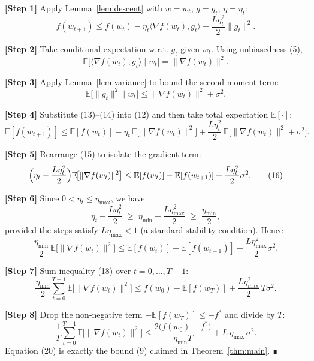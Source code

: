 \documentclass{article}
\begin{document}
\noindent\textbf{[Step 1]} Apply Lemma~\ref{lem:descent} with $w=w_t$, $g=g_t$, $\eta=\eta_t$:
\[
f(w_{t+1})\le f(w_t)-\eta_t\langle\nabla f(w_t),g_t\rangle+\frac{L\eta_t^{2}}{2}\|g_t\|^{2}.
\tag{12}
\]

\noindent\textbf{[Step 2]} Take conditional expectation w.r.t. $g_t$ given $w_t$.
Using unbiasedness (5),
\[
\mathbb{E}\big[\langle\nabla f(w_t),g_t\rangle\mid w_t\big]
    =\|\nabla f(w_t)\|^{2}.
\tag{13}
\]

\noindent\textbf{[Step 3]} Apply Lemma~\ref{lem:variance} to bound the second moment term:
\[
\mathbb{E}\big[\|g_t\|^{2}\mid w_t\big]
    \le \|\nabla f(w_t)\|^{2}+\sigma^{2}.
\tag{14}
\]

\noindent\textbf{[Step 4]} Substitute (13)–(14) into (12) and then take total expectation $\mathbb{E}[\cdot]$:
\[
\mathbb{E}[f(w_{t+1})]
\le \mathbb{E}[f(w_t)]
      -\eta_t\,\mathbb{E}\!\big[\|\nabla f(w_t)\|^{2}\big]
      +\frac{L\eta_t^{2}}{2}\,\mathbb{E}\!\big[\|\nabla f(w_t)\|^{2}+\sigma^{2}\big].
\tag{15}
\]

\noindent\textbf{[Step 5]} Rearrange (15) to isolate the gradient term:
\[
\Bigl(\eta_t-\frac{L\eta_t^{2}}{2}\Bigr)\mathbb{E}\!\big[\|\nabla f(w_t)\|^{2}\big]
\le \mathbb{E}[f(w_t)]-\mathbb{E}[f(w_{t+1})]+\frac{L\eta_t^{2}}{2}\sigma^{2}.
\tag{16}
\]

\noindent\textbf{[Step 6]} Since $0<\eta_t\le\eta_{\max}$, we have
\[
\eta_t-\frac{L\eta_t^{2}}{2}
\;\ge\;
\eta_{\min}-\frac{L\eta_{\max}^{2}}{2}
\;\ge\;
\frac{\eta_{\min}}{2},
\tag{17}
\]
provided the steps satisfy $L\eta_{\max}<1$ (a standard stability condition).  Hence
\[
\frac{\eta_{\min}}{2}\,\mathbb{E}\!\big[\|\nabla f(w_t)\|^{2}\big]
\le
\mathbb{E}[f(w_t)]-\mathbb{E}[f(w_{t+1})]+\frac{L\eta_{\max}^{2}}{2}\sigma^{2}.
\tag{18}
\]

\noindent\textbf{[Step 7]} Sum inequality (18) over $t=0,\dots,T-1$:
\[
\frac{\eta_{\min}}{2}\sum_{t=0}^{T-1}\mathbb{E}\!\big[\|\nabla f(w_t)\|^{2}\big]
\le
f(w_{0})- \mathbb{E}[f(w_{T})] + \frac{L\eta_{\max}^{2}}{2}\,T\sigma^{2}.
\tag{19}
\]

\noindent\textbf{[Step 8]} Drop the non‑negative term $-\mathbb{E}[f(w_T)]\le -f^{*}$ and divide by $T$:
\[
\frac{1}{T}\sum_{t=0}^{T-1}\mathbb{E}\!\big[\|\nabla f(w_t)\|^{2}\big]
\le
\frac{2\big(f(w_{0})-f^{*}\big)}{\eta_{\min}T}
   + L\,\eta_{\max}\,\sigma^{2}.
\tag{20}
\]
Equation (20) is exactly the bound (9) claimed in Theorem~\ref{thm:main}. ∎
\end{document}
